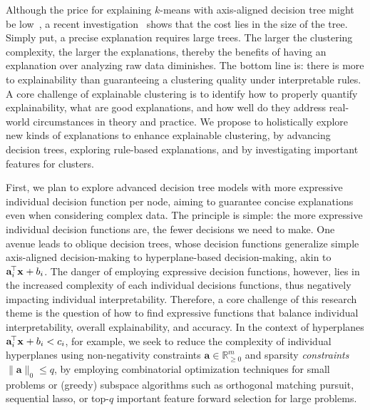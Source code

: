 \documentclass[a4paper,11pt]{article}
\begin{document}
Although the price for explaining $k$-means with axis-aligned decision tree might be low~\cite{gupta2023price}, 
a recent investigation~\cite{deng2023impossibility} shows that the cost lies in the size of the tree.
Simply put, a precise explanation requires large trees.
The larger the clustering complexity, the larger the explanations, thereby 
the benefits of having an explanation over analyzing raw data diminishes.
The bottom line is: there is more to explainability than guaranteeing a clustering quality under interpretable rules.
A core challenge of explainable clustering is to identify how to properly quantify explainability,
what are good explanations, and how well do they address real-world circumstances in theory and practice.
We propose to holistically explore new kinds of explanations to enhance explainable clustering,
by advancing decision trees, exploring rule-based explanations, and by investigating important features for clusters.

First, we plan to explore advanced decision tree models with more expressive individual decision function per node, aiming to guarantee concise explanations even when considering complex data.
The principle is simple: the more expressive individual decision functions are, the fewer decisions we need to make. 
One avenue leads to oblique decision trees, whose decision functions generalize simple axis-aligned decision-making to hyperplane-based decision-making, akin to $\mathbf{a}_i^{\!\top} \mathbf{x}^{\vphantom{\top}}_{\vphantom{i}} + b_i$. %
The danger of employing expressive decision functions, however, lies in the increased complexity of each individual decisions functions, thus negatively impacting individual interpretability.
Therefore, a core challenge of this research theme is the question of how to find expressive functions that balance individual interpretability, overall explainability, and accuracy.
In the context of hyperplanes $\mathbf{a}_i^{\!\top} \mathbf{x}^{\vphantom{\top}}_{\vphantom{i}} + b_i < c_i$, for example, we seek to reduce the complexity of individual hyperplanes using non-negativity constraints $\mathbf{a} \in \mathbb{R}^m_{\geq 0}$ and sparsity \emph{constraints} $\|\mathbf{a}\|_0 \leq q$, by employing combinatorial optimization techniques for small problems or (greedy) subspace algorithms such as orthogonal matching pursuit, sequential lasso, or top-$q$ important feature forward selection for large problems.
\end{document}
